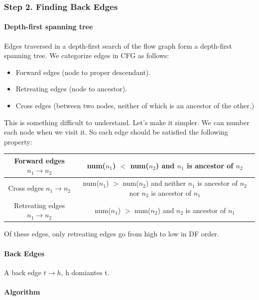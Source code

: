 \subsubsection{Step 2. Finding Back Edges}

\paragraph{Depth-first spanning tree}
Edges traversed in a depth-first search of the flow graph form a depth-first spanning tree. We categorize edges in CFG as follows:
\begin{itemize}
    \item Forward edges (node to proper descendant).
    \item Retreating edges (node to ancestor).
    \item Cross edges (between two nodes, neither of which is an ancestor of the other.)
\end{itemize}

This is something difficult to understand. Let's make it simpler. We can number each node when we visit it. So each edge should be satisfied the following property:


\begin{center}
 \begin{tabular}{|c|c|}
\hline Forward edges  \( n_1 \rightarrow n_2\) & num($n_1$) $<$ num($n_2$) and  $n_1$ is ancestor of  $n_2$\\
\hline Cross edges  \( n_1 \rightarrow n_2\)& num($n_1$) $>$ num($n_2$) and neither  $n_1$ is ancestor of  $n_2$ nor $n_2$ is ancestor of  $n_1$ \\
\hline Retreating edges  \( n_1 \rightarrow n_2\) & num($n_1$) $>$ num($n_2$) and  $n_2$ is ancestor of  $n_1$\\
\hline
\end{tabular}  
\end{center}





Of these edges, only retreating edges go from high to low in DF order.

\paragraph{Back Edges}

A back edge \( t \rightarrow h \), h domiantes t.

\paragraph{Algorithm}

